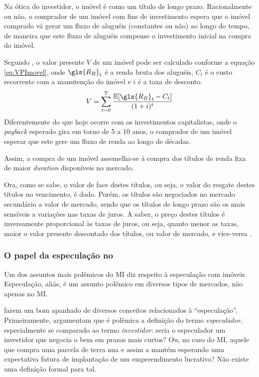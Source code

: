 \documentclass[
	12pt,				%
	oneside,			%
	a4paper,			%
	chapter=TITLE,		%
	section=TITLE,		%
	english,			%
	brazil				%
	]{abntex2}
\begin{document}
\begin{refsection}
Na ótica do investidor, o imóvel é como um título de longo prazo. Racionalmente
ou não, o comprador de um imóvel com fins de investimento espera que o imóvel
comprado vá gerar um fluxo de aluguéis (constantes ou não) ao longo do tempo, de
maneira que este fluxo de aluguéis compense o investimento inicial na compra do
imóvel.

Segundo \textcite[p.~4]{Malpezzi2002TheRO}, o valor presente \(V\) de um imóvel pode ser
calculado conforme a equação \eqref{eq:VPImovel}, onde \(\gls{R_B}_t\) é a renda
bruta dos aluguéis, \(C_t\) é o custo recorrente com a manutenção do imóvel e \(i\)
é a taxa de desconto.
\begin{equation}
V = \sum_{t=0}^T \frac{\mathbb{E}[\gls{R_B}_t-C_t]}{(1+i)^t}
\label{eq:VPImovel}
\end{equation}
Diferentemente do que hoje ocorre com os investimentos capitalistas, onde o
\emph{payback} esperado gira em torno de 5 a 10 anos, o comprador de um imóvel
esperar que este gere um fluxo de renda ao longo de décadas.

Assim, a compra de um imóvel assemelha-se à compra dos títulos de renda fixa de
maior \emph{duration} disponíveis no mercado.

Ora, como se sabe, o valor de face destes títulos, ou seja, o valor do resgate
destes títulos no vencimento, é dado. Porém, os títulos são negociados no
mercado secundário a valor de mercado, sendo que os títulos de longo prazo são
os mais sensíveis a variações nas taxas de juros. A saber, o preço destes
títulos é inversamente proporcional às taxas de juros, ou seja, quanto menor as
taxas, maior o valor presente descontado dos títulos, ou valor de mercado, e
vice-versa \autocite[79]{resende}.

\hypertarget{o-papel-da-especulauxe7uxe3o-no}{%
\subsubsection{\texorpdfstring{O papel da especulação no }{O papel da especulação no }}\label{o-papel-da-especulauxe7uxe3o-no}}

Um dos assuntos mais polêmicos do \gls{MI} diz respeito à especulação com
imóveis. Especulação, aliás, é um assunto polêmico em diversos tipos de
mercados, não apenas no \gls{MI}.

\textcite[p.~5]{Malpezzi2002TheRO} fazem um bom apanhado de diversos conceitos
relacionados à ``especulação''. Primeiramente, argumentam que é polêmica a
definição do termo \emph{especulador}, especialmente se comparado ao termo
\emph{investidor}: seria o especulador um investidor que negocia o bem em prazos
mais curtos? Ou, no caso do \gls{MI}, aquele que compra uma parcela de terra nua
e assim a mantém esperando uma expectativa futura de implantação de um
empreendimento lucrativo? Não existe uma definição formal para tal.


\end{refsection}
\end{document}
